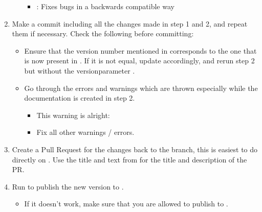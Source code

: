 \documentclass[a4paper,10pt,english]{sphinxmanual}
\begin{document}
\begin{enumerate}
\begin{itemize}
\begin{itemize}
\item {}
\sphinxAtStartPar
{}: Fixes bugs in a backwards compatible way

\end{itemize}

\end{itemize}

\item {}
\sphinxAtStartPar
Make a commit including all the changes made in step 1 and 2, and repeat them if necessary. Check the following before committing:
\begin{itemize}
\item {}
\sphinxAtStartPar
Ensure that the version number mentioned in  corresponds to the one that is now present in . If it is not equal, update  accordingly, and rerun step 2 but without the version\sphinxhyphen{}parameter .

\item {}
\sphinxAtStartPar
Go through the errors and warnings which are thrown especially while the documentation is created in step 2.
\begin{itemize}
\item {}
\sphinxAtStartPar
This warning is alright: 

\item {}
\sphinxAtStartPar
Fix all other warnings / errors.

\end{itemize}

\end{itemize}

\item {}
\sphinxAtStartPar
Create a Pull Request for the changes back to the \sphinxhyphen{}branch, this is easiest to do directly on . Use the title and text from  for the title and description of the PR.

\item {}
\sphinxAtStartPar
Run  to publish the new version to .
\begin{itemize}
\item {}
\sphinxAtStartPar
If it doesn’t work, make sure that you are allowed to publish to .


\end{itemize}
\end{enumerate}
\end{document}
